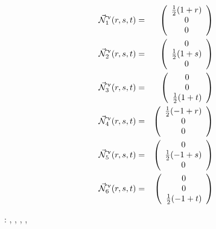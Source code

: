 \begin{mdframed}[backgroundcolor=blue!5]
\begin{eqnarray}
\vec{{\mathcal{N}}}^\upnu_1 (r,s,t) &=& 
\left(\begin{array}{c} \frac12 (1+r) \\ 0 \\ 0\end{array}\right) \nonumber\\
\vec{{\mathcal{N}}}^\upnu_2 (r,s,t) &=& 
\left(\begin{array}{c} 0 \\ \frac12 (1+s) \\0 \end{array}\right) \nonumber\\
\vec{{\mathcal{N}}}^\upnu_3 (r,s,t) &=& 
\left(\begin{array}{c} 0 \\  0 \\\frac12 (1+t)  \end{array}\right) \nonumber\\
\vec{{\mathcal{N}}}^\upnu_4 (r,s,t) &=& 
\left(\begin{array}{c} \frac12 (-1+r) \\ 0 \\ 0 \end{array}\right) \nonumber\\
\vec{{\mathcal{N}}}^\upnu_5 (r,s,t) &=& 
\left(\begin{array}{c} 0 \\ \frac12 (-1+s)  \\ 0 \end{array}\right) \nonumber\\
\vec{{\mathcal{N}}}^\upnu_6 (r,s,t) &=& 
\left(\begin{array}{c} 0 \\ 0 \\\frac12 (-1+t)  \end{array}\right)
\end{eqnarray}
\end{mdframed}



\vspace{1cm}

\Literature: ,
 , , 
 , 
